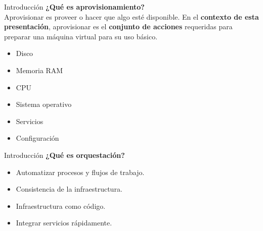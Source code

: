 \begin{frame}{Introducción}
    \vspace{0cm}
    \textbf{¿Qué es aprovisionamiento?}
    \\
    Aprovisionar es proveer o hacer que algo esté disponible. En el \textbf{contexto de esta presentación}, aprovisionar es el \textbf{conjunto de acciones} requeridas para preparar una máquina virtual para su uso básico.

    \begin{itemize}
        \item Disco
        \item Memoria RAM
        \item CPU
        \item Sistema operativo
        \item Servicios
        \item Configuración
    \end{itemize}


\end{frame}

\begin{frame}{Introducción}
    \vspace{0cm}
    \textbf{¿Qué es orquestación?}
    \begin{itemize}
        \item Automatizar procesos y flujos de trabajo.
        \item Consistencia de la infraestructura.
        \item Infraestructura como código.
        \item Integrar servicios rápidamente.
    \end{itemize}

\end{frame}
